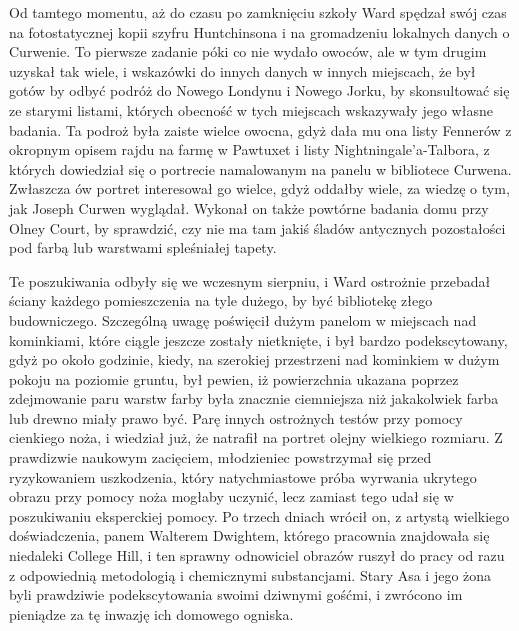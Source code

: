 Od tamtego momentu, aż do czasu po zamknięciu szkoły Ward spędzał swój czas na fotostatycznej kopii szyfru Huntchinsona i na gromadzeniu lokalnych danych o Curwenie. To pierwsze zadanie póki co nie wydało owoców, ale w tym drugim uzyskał tak wiele, i wskazówki do innych danych w innych miejscach, że był gotów by odbyć podróż do Nowego Londynu i Nowego Jorku, by skonsultować się ze starymi listami, których obecność w tych miejscach wskazywały jego własne badania. Ta podroż była zaiste wielce owocna, gdyż dała mu ona listy Fennerów z okropnym opisem rajdu na farmę w Pawtuxet i listy Nightningale'a-Talbora, z których dowiedział się o portrecie namalowanym na panelu w bibliotece Curwena. Zwłaszcza ów portret interesował go wielce, gdyż oddałby wiele, za wiedzę o tym, jak Joseph Curwen wyglądał. Wykonał on także powtórne badania domu przy Olney Court, by sprawdzić, czy nie ma tam jakiś śladów antycznych pozostałości pod farbą lub warstwami spleśniałej tapety. 

Te poszukiwania odbyły się we wczesnym sierpniu, i Ward ostrożnie przebadał ściany każdego pomieszczenia na tyle dużego, by być bibliotekę złego budowniczego. Szczególną uwagę poświęcił dużym panelom w miejscach nad kominkiami, które ciągle jeszcze zostały nietknięte, i był bardzo podekscytowany, gdyż po około godzinie, kiedy, na szerokiej przestrzeni nad kominkiem w dużym pokoju na poziomie gruntu, był pewien, iż powierzchnia ukazana poprzez zdejmowanie paru warstw farby była znacznie ciemniejsza niż jakakolwiek farba lub drewno miały prawo być. Parę innych ostrożnych testów przy pomocy cienkiego noża, i wiedział już, że natrafił na portret olejny wielkiego rozmiaru. Z prawdizwie naukowym zacięciem, młodzieniec powstrzymał się przed ryzykowaniem uszkodzenia, który natychmiastowe próba wyrwania ukrytego obrazu przy pomocy noża mogłaby uczynić, lecz zamiast tego udał się w poszukiwaniu eksperckiej pomocy. Po trzech dniach wrócił on, z artystą wielkiego doświadczenia, panem Walterem Dwightem,  którego pracownia znajdowała się niedaleki College Hill, i ten sprawny odnowiciel obrazów ruszył do pracy od razu z odpowiednią metodologią i chemicznymi substancjami. Stary Asa i jego żona byli prawdziwie podekscytowania swoimi dziwnymi gośćmi, i zwrócono im pieniądze za tę inwazję ich domowego ogniska.

